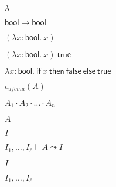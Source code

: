 \documentclass[10pt]{book}
\begin{document}
\begin{mdSnippets}
\begin{mdInlineSnippet}[c6a6eb61fd9c6c913da73b3642ca147d]%
$\lambda$\end{mdInlineSnippet}%
\begin{mdInlineSnippet}%
$\mathsf{bool} \to \mathsf{bool}$\end{mdInlineSnippet}%
\begin{mdInlineSnippet}[4019aa601ec5cb26470e0f674f9f8d85]%
$(\lambda x:\mathsf{bool}.~x)$\end{mdInlineSnippet}%
\begin{mdInlineSnippet}%
$(\lambda x:\mathsf{bool}.~x)~\mathsf{true}$\end{mdInlineSnippet}%
\begin{mdInlineSnippet}%
$\lambda x:\mathsf{bool}.~\mathsf{if }~x~\mathsf{ then~false~else~true}$\end{mdInlineSnippet}%
\begin{mdInlineSnippet}%
$\epsilon_{ufcma}(A)$\end{mdInlineSnippet}%
\begin{mdInlineSnippet}[f7a75feca7ee25528a0a3770e779043c]%
$A_1 \cdot A_2 \cdot \dots \cdot A_n$\end{mdInlineSnippet}%
\begin{mdInlineSnippet}[7fc56270e7a70fa81a5935b72eacbe29]%
$A$\end{mdInlineSnippet}%
\begin{mdInlineSnippet}[dd7536794b63bf90eccfd37f9b147d7f]%
$I$\end{mdInlineSnippet}%
\begin{mdInlineSnippet}%
$I_1 ,\dots ,I_\ell \vdash A \leadsto I$\end{mdInlineSnippet}%
\begin{mdInlineSnippet}[dd7536794b63bf90eccfd37f9b147d7f]%
$I$\end{mdInlineSnippet}%
\begin{mdInlineSnippet}[822ae6010ecfaad46057336a53e9ea2f]%
$I_1 ,\dots,I_\ell$\end{mdInlineSnippet}%

\end{mdSnippets}
\end{document}
